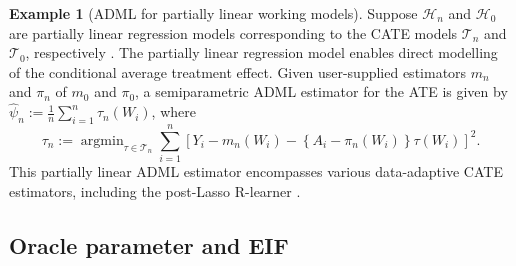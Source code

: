 \documentclass[11pt]{article}
\DeclareMathOperator*{\argmin}{argmin}
\theoremstyle{definition}
\newtheorem{example}{Example}
\newtheorem*{example*}{Example}
\begin{document}
 \begin{example*}[ADML for partially linear working models]
    \label{example::partially::intro}
   Suppose $\mathcal{H}_n$ and $\mathcal{H}_0$ are partially linear regression models corresponding to the CATE models $ \mathcal{T}_n$ and $\mathcal{T}_0$, respectively \citep{robinson1988root}. The partially linear regression model enables direct modelling of the conditional average treatment effect. Given user-supplied estimators $m_n$ and $\pi_n$ of $m_0$ and $\pi_0$, a semiparametric ADML estimator for the ATE is given by $\widehat\psi_n := \frac{1}{n}\sum_{i=1}^n \tau_n(W_i)$, where
$$\tau_n := \argmin_{\tau\in {\mathcal{T}}_n} \sum_{i=1}^n \left[Y_i - m_n(W_i) - \left\{A_i - \pi_n(W_i)\right\}\tau(W_i)\right]^2.$$
This partially linear ADML estimator encompasses various data-adaptive CATE estimators, including the post-Lasso R-learner \citep{belloni2014inference, zhao2017selective, nie2021quasi}.
\end{example*}
 


\subsection{Oracle parameter and EIF}
\label{section::oracleparam::example}

 

 
\end{document}
